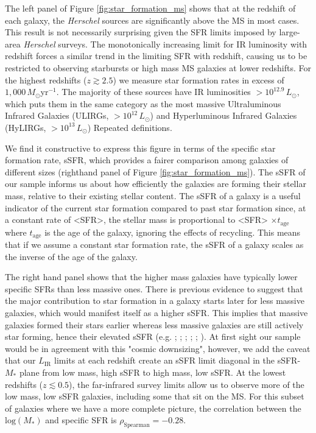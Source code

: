 The left panel of Figure \ref{fig:star_formation_ms} shows that at the redshift of each galaxy, the \textit{Herschel} sources are significantly above the MS in most cases. This result is not necessarily surprising given the SFR limits imposed by large-area \textit{Herschel} surveys. The monotonically increasing limit for IR luminosity with redshift forces a similar trend in the limiting SFR with redshift, causing us to be restricted to observing starbursts or high mass MS galaxies at lower redshifts. For the highest redshifts ($z \gtrsim 2.5$) we measure star formation rates in excess of $1,000\,M_\odot$yr$^{-1}$. The majority of these sources have IR luminosities $> 10^{12.9}\,L_\odot$, which puts them in the same category as the most massive Ultraluminous Infrared Galaxies (ULIRGs, $> 10^{12}\,L_\odot$) and Hyperluminous Infrared Galaxies (HyLIRGs, $> 10^{13}\,L_\odot$) {\color{red}Repeated definitions}. 

We find it constructive to express this figure in terms of the specific star formation rate, sSFR, which provides a fairer comparison among galaxies of different sizes (righthand panel of Figure \ref{fig:star_formation_ms}). The sSFR of our sample informs us about how efficiently the galaxies are forming their stellar mass, relative to their existing stellar content. The sSFR of a galaxy is a useful indicator of the current star formation compared to past star formation since, at a constant rate of <SFR>, the stellar mass is proportional to <SFR> $\times t_{\textrm{age}}$ where $t_{\textrm{age}}$ is the age of the galaxy, ignoring the effects of recycling. This means that if we assume a constant star formation rate, the sSFR of a galaxy scales as the inverse of the age of the galaxy.

The right hand panel shows that the higher mass galaxies have typically lower specific SFRs than less massive ones. There is previous evidence to suggest that the major contribution to star formation in a galaxy starts later for less massive galaxies, which would manifest itself as a higher sSFR. This implies that massive galaxies formed their stars earlier whereas less massive galaxies are still actively star forming, hence their elevated sSFR (e.g. \citealt{Brinchmann_2000}; \citealt{Juneau_2005}; \citealt{Bell_2005}; \citealt{caputi_2006}; \citealt{Reddy_2006}; \citealt{Noeske_2007}). At first sight our sample would be in agreement with this "cosmic downsizing", however, we add the caveat that our $L_{\textrm{IR}}$ limits at each redshift create an sSFR limit diagonal in the sSFR-$M_*$ plane from low mass, high sSFR to high mass, low sSFR. At the lowest redshifts ($z \lesssim 0.5$), the far-infrared survey limits allow us to observe more of the low mass, low sSFR galaxies, including some that sit on the MS. For this subset of galaxies where we have a more complete picture, the correlation between the $\textrm{log}(M_*)$ and specific SFR is $\rho_{\textrm{Spearman}} = -0.28$.

